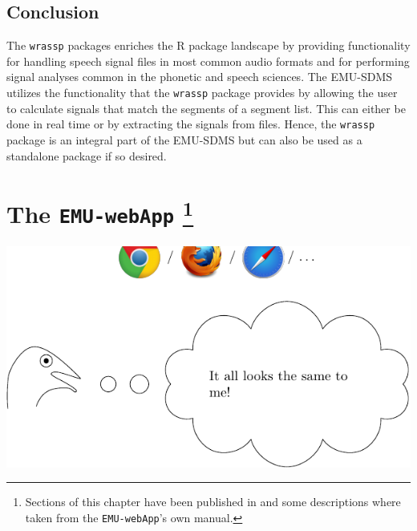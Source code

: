 \documentclass[]{book}
\let\rmarkdownfootnote\footnote%
\def\footnote{\protect\rmarkdownfootnote}
\theoremstyle{definition}
\theoremstyle{definition}
\theoremstyle{definition}
\theoremstyle{remark}
\begin{document}
\hypertarget{conclusion-4}{%
\section{Conclusion}\label{conclusion-4}}

The \texttt{wrassp} packages enriches the R package landscape by
providing functionality for handling speech signal files in most common
audio formats and for performing signal analyses common in the phonetic
and speech sciences. The EMU-SDMS utilizes the functionality that the
\texttt{wrassp} package provides by allowing the user to calculate
signals that match the segments of a segment list. This can either be
done in real time or by extracting the signals from files. Hence, the
\texttt{wrassp} package is an integral part of the EMU-SDMS but can also
be used as a standalone package if so desired.

\hypertarget{chap:emu-webApp}{%
\chapter[The \texttt{EMU-webApp} ]{\texorpdfstring{The
\texttt{EMU-webApp} \footnote{Sections of this chapter have been
  published in \citep{winkelmann:2015d} and some descriptions where
  taken from the \texttt{EMU-webApp}'s own manual.}}{The EMU-webApp }}\label{chap:emu-webApp}}

\begin{center}\includegraphics[width=0.75\linewidth]{pics/EMU-webAppEmu_emu-webApp} \end{center}
\end{document}
